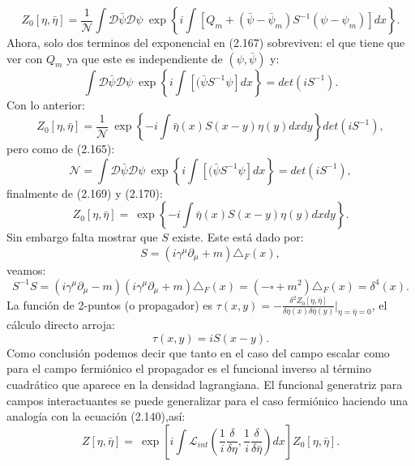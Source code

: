 \begin{equation}
Z_{0}[\eta,\bar{\eta}]=\frac{1}{\mathcal{N}}\int\mathcal{D}\bar{\psi}\mathcal{\mathcal{D}}\psi\ \exp\left\{ i\int\left[Q_{m}+(\bar{\psi}-\bar{\psi}_{m})S^{-1}(\psi-\psi_{m})\right]dx\right\} .
\end{equation}
Ahora, solo dos terminos del exponencial en (2.167) sobreviven: el que tiene que ver con $Q_m$ ya que este es independiente de $(\psi,\bar{\psi})$ y:
\begin{equation}
\int\mathcal{D}\bar{\psi}\mathcal{\mathcal{D}}\psi\ \exp\left\{ i\int\left[(\bar{\psi}S^{-1}\psi\right]dx\right\} =det(iS^{-1}) .
\end{equation}
Con lo anterior:
\begin{equation}
Z_{0}[\eta,\bar{\eta}]=\frac{1}{\mathcal{N}}\ \exp\left\{ -i\int\bar{\eta}(x)S(x-y)\eta(y)dxdy\right\} det(iS^{-1}),
\end{equation}
pero como de (2.165):
\begin{equation}
\mathcal{N}=\int\mathcal{D}\bar{\psi}\mathcal{\mathcal{D}}\psi\ \exp\left\{ i\int\left[(\bar{\psi}S^{-1}\psi\right]dx\right\} =det(iS^{-1}),
\end{equation}
finalmente de (2.169) y (2.170):
\begin{equation}
Z_{0}[\eta,\bar{\eta}]=\ \exp\left\{ -i\int\bar{\eta}(x)S(x-y)\eta(y)dxdy\right\} .
\end{equation}
Sin embargo falta mostrar que $S$ existe. Este está dado por:
\begin{equation}
S=(i\gamma^{\mu}\partial_{\mu}+m)\triangle_{F}(x),
\end{equation}
veamos:
\begin{equation}
S^{-1}S=(i\gamma^{\mu}\partial_{\mu}-m)(i\gamma^{\mu}\partial_{\mu}+m)\triangle_{F}(x)=(-\square+m^{2})\triangle_{F}(x)=\delta^{4}(x).
\end{equation}
La función de 2-puntos (o propagador) es $\tau(x,y)=-\frac{\delta^{2}Z_{0}[\eta,\bar{\eta}]}{\delta\eta(x)\delta\bar{\eta}(y)}\bigg|_{\eta=\bar{\eta}=0}$, el cálculo directo arroja:
\begin{equation}
\tau(x,y)=iS(x-y).
\end{equation}
Como conclusión podemos decir que tanto en el caso del campo escalar como para el campo fermiónico el propagador es el funcional inverso al término cuadrático que aparece en la densidad lagrangiana. El funcional generatriz para campos interactuantes se puede generalizar para el caso fermiónico haciendo una analogía con la ecuación (2.140),así:
\begin{equation}
Z[\eta,\bar{\eta}]=\ \exp\left[i\int\mathcal{L}_{int}\left(\frac{1}{i}\frac{\delta}{\delta\eta},\frac{1}{i}\frac{\delta}{\delta\bar{\eta}}\right)dx\right]Z_{0}[\eta,\bar{\eta}].
\end{equation}

